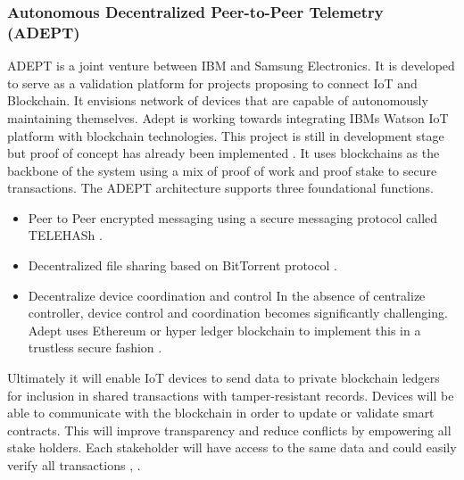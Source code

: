 \subsubsection{Autonomous Decentralized Peer-to-Peer Telemetry (ADEPT)} \label{Adept}
ADEPT is a joint venture between IBM and Samsung Electronics. It is developed to serve as a validation platform for projects proposing to connect IoT and Blockchain. It envisions network of devices that are capable of autonomously maintaining themselves. Adept is working towards integrating IBMs Watson IoT platform with blockchain technologies. This project is still in development stage but proof of concept has already been implemented \cite{misc:005}. It uses blockchains as the backbone of the system using a mix of proof of work and proof stake to secure transactions. The ADEPT architecture supports three foundational functions.
\begin{itemize}
  \item Peer to Peer encrypted messaging using a secure messaging protocol called TELEHASh \cite{misc:005}.
  \item Decentralized file sharing based on BitTorrent protocol \cite{misc:005}.
\item Decentralize device coordination and control
In the absence of centralize controller, device control and coordination becomes significantly challenging. Adept uses Ethereum or hyper ledger blockchain to implement this in a trustless secure fashion \cite{misc:005}.

\end{itemize}
Ultimately it will enable IoT devices to send data to private blockchain ledgers for inclusion in shared transactions with tamper-resistant records. Devices will be able to communicate with the blockchain in order to update or validate smart contracts. This will improve transparency and reduce conflicts by empowering all stake holders. Each stakeholder will have access to the same data and could easily verify all transactions \cite{misc:005}, \cite{misc:004}. 


